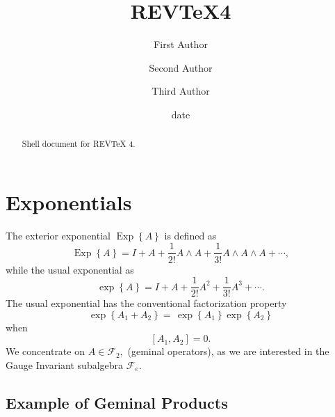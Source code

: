 \documentclass[aps,preprint]{revtex4}%
\begin{document}
\title[Short title for running header]{REV\TeX4}
\author{First Author}
\author{Second Author}
\author{Third Author}

\begin{abstract}
Shell document for REV\TeX{} 4.

\end{abstract}
\date[Date text]{date}




\maketitle
\tableofcontents


\section{Exponentials}

The exterior exponential $\operatorname{Exp}\left\{  A\right\}  $ is defined
as
\begin{equation}
\operatorname{Exp}\left\{  A\right\}  =I+A+\frac{1}{2!}A\wedge A+\frac{1}%
{3!}A\wedge A\wedge A+\cdots,
\end{equation}
while the usual exponential as
\begin{equation}
\exp\left\{  A\right\}  =I+A+\frac{1}{2!}A^{2}+\frac{1}{3!}A^{3}+\cdots.
\end{equation}
The usual exponential has the conventional factorization property
\begin{equation}
\exp\left\{  A_{1}+A_{2}\right\}  =\,\exp\left\{  A_{1}\right\}  \exp\left\{
A_{2}\right\}
\end{equation}
when
\begin{equation}
\left[  A_{1},A_{2}\right]  =0.
\end{equation}
We concentrate on $A\in\mathcal{F}_{2},$ (geminal operators), as we are
interested in the Gauge Invariant subalgebra $\mathcal{F}_{e}.$

\subsection{Example of Geminal Products}
\end{document}
